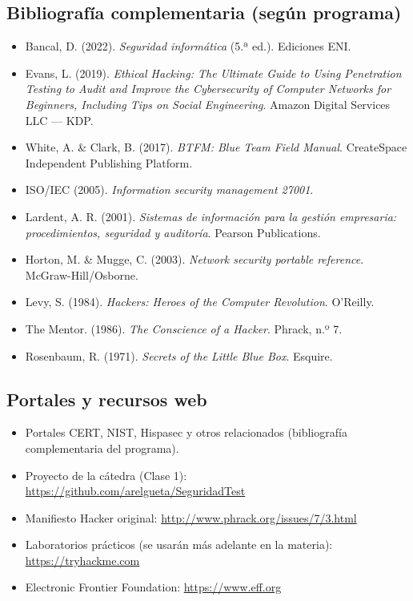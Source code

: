 \documentclass[11pt,a4paper]{article}
\begin{document}
\subsection{Bibliografía complementaria (según programa)}
\begin{itemize}[leftmargin=*]
  \item Bancal, D. (2022). \textit{Seguridad informática} (5.ª ed.). Ediciones ENI.
  \item Evans, L. (2019). \textit{Ethical Hacking: The Ultimate Guide to Using Penetration Testing to Audit and Improve the Cybersecurity of Computer Networks for Beginners, Including Tips on Social Engineering}. Amazon Digital Services LLC --- KDP.
  \item White, A. \& Clark, B. (2017). \textit{BTFM: Blue Team Field Manual}. CreateSpace Independent Publishing Platform.
  \item ISO/IEC (2005). \textit{Information security management 27001}.
  \item Lardent, A. R. (2001). \textit{Sistemas de información para la gestión empresaria: procedimientos, seguridad y auditoría}. Pearson Publications.
  \item Horton, M. \& Mugge, C. (2003). \textit{Network security portable reference}. McGraw-Hill/Osborne.
  \item Levy, S. (1984). \textit{Hackers: Heroes of the Computer Revolution}. O'Reilly.
  \item The Mentor. (1986). \textit{The Conscience of a Hacker}. Phrack, n.º 7.
  \item Rosenbaum, R. (1971). \textit{Secrets of the Little Blue Box}. Esquire.
\end{itemize} 

\subsection{Portales y recursos web}
\begin{itemize}[leftmargin=*]
  \item Portales CERT, NIST, Hispasec y otros relacionados (bibliografía complementaria del programa).
  \item Proyecto de la cátedra (Clase 1): \url{https://github.com/arelgueta/SeguridadTest}
  \item Manifiesto Hacker original: \url{http://www.phrack.org/issues/7/3.html}
  \item Laboratorios prácticos (se usarán más adelante en la materia): \url{https://tryhackme.com}
  \item Electronic Frontier Foundation: \url{https://www.eff.org}
\end{itemize}
\end{document}
